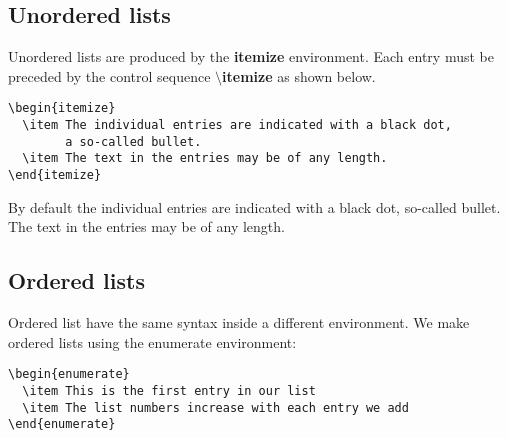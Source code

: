\documentclass[12pt]{article}
\begin{document}
\subsection{Unordered lists}

Unordered lists are produced by the \textbf{itemize} environment. Each entry must be preceded by the control sequence $ \setminus $\textbf{itemize} as shown below.

\begin{verbatim}
\begin{itemize}
  \item The individual entries are indicated with a black dot, 
        a so-called bullet.
  \item The text in the entries may be of any length.
\end{itemize}
\end{verbatim}

By default the individual entries are indicated with a black dot, so-called bullet. The text in the entries may be of any length.

\subsection{Ordered lists}

Ordered list have the same syntax inside a different environment. We make ordered lists using the enumerate environment:

\begin{verbatim}
\begin{enumerate}
  \item This is the first entry in our list
  \item The list numbers increase with each entry we add
\end{enumerate}
\end{verbatim}
\end{document}
